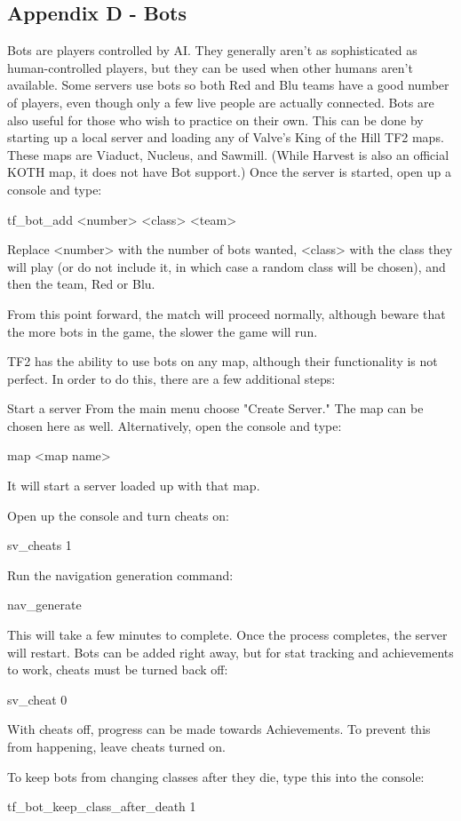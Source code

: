\subsection{Appendix D - Bots}
Bots are players controlled by AI.  They generally aren't as sophisticated as human-controlled players, but they can be used when other humans aren't available.  Some servers use bots so both Red and Blu teams have a good number of players, even though only a few live people are actually connected.  Bots are also useful for those who wish to practice on their own.  This can be done by starting up a local server and loading any of Valve's King of the Hill TF2 maps. These maps are Viaduct, Nucleus, and Sawmill.  (While Harvest is also an official KOTH map, it does not have Bot support.)  Once the server is started, open up a console and type:

tf\_bot\_add <number> <class> <team>

Replace <number> with the number of bots wanted, <class> with the class they will play (or do not include it, in which case a random class will be chosen), and then the team, Red or Blu.

From this point forward, the match will proceed normally, although beware that the more bots in the game, the slower the game will run.

TF2 has the ability to use bots on any map, although their functionality is not perfect.  In order to do this, there are a few additional steps:

Start a server From the main menu choose "Create Server."  The map can be chosen here as well.  Alternatively, open the console and type:

map <map name>

It will start a server loaded up with that map.

Open up the console and turn cheats on:

sv\_cheats 1

Run the navigation generation command:

nav\_generate

This will take a few minutes to complete.  Once the process completes, the server will restart.  Bots can be added right away, but for stat tracking and achievements to work, cheats must be turned back off:

sv\_cheat 0

With cheats off, progress can be made towards Achievements.  To prevent this from happening, leave cheats turned on.

To keep bots from changing classes after they die, type this into the console:

tf\_bot\_keep\_class\_after\_death 1